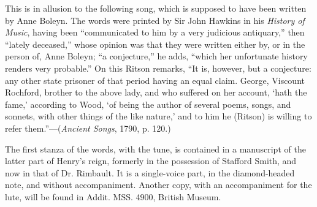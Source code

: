 This is in allusion to the following song, which is supposed to have been written
by Anne Boleyn. The words were printed by Sir John Hawkins in his \textit{History
of Music}, having been “communicated to him by a very judicious antiquary,”
then “lately deceased,” whose opinion was that they were written either by, or in
the person of, Anne Boleyn; “a conjecture,” he adds, “which her unfortunate
history renders very probable.” On this Ritson remarks, “It is, however, but a
conjecture: any other state prisoner of \pagebreak that period having an equal claim.
George, Viscount Rochford, brother to the above lady, and who suffered on her
account, ‘hath the fame,’ according to Wood, ‘of being the author of several
poems, songs, and sonnets, with other things of the like nature,’ and to him he
(Ritson) is willing to refer them.”—(\textit{Ancient Songs}, 1790, p. 120.)

The first stanza of the words, with the tune, is contained in a manuscript of
the latter part of Henry’s reign, formerly in the possession of Stafford Smith,
and now in that of Dr. Rimbault. It is a single-voice part, in the diamond-headed
note, and without accompaniment. Another copy, with an accompaniment for the
lute, will be found in Addit. MSS. 4900, British Museum.


\smallskip


\pagebreak

